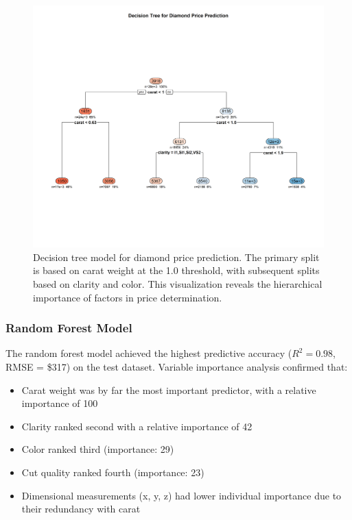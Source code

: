\documentclass[11pt,a4paper]{article}
\begin{document}
\begin{figure}[H]
    \centering
    \includegraphics[width=1.0\textwidth]{decision_tree.png}
    \caption{Decision tree model for diamond price prediction. The primary split is based on carat weight at the 1.0 threshold, with subsequent splits based on clarity and color. This visualization reveals the hierarchical importance of factors in price determination.}
    \label{fig:decision_tree}
\end{figure}

\subsubsection{Random Forest Model}

The random forest model achieved the highest predictive accuracy ($R^2 = 0.98$, RMSE = \$317) on the test dataset. Variable importance analysis confirmed that:

\begin{itemize}
    \item Carat weight was by far the most important predictor, with a relative importance of 100
    \item Clarity ranked second with a relative importance of 42
    \item Color ranked third (importance: 29)
    \item Cut quality ranked fourth (importance: 23)
    \item Dimensional measurements (x, y, z) had lower individual importance due to their redundancy with carat
\end{itemize}
\end{document}
